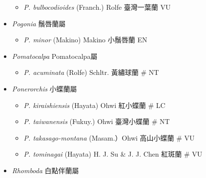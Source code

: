 \begin{itemize}
  \begin{itemize}
        \item[] \textit{P. bulbocodioides} (Franch.) Rolfe  臺灣一葉蘭   VU
  \end{itemize}
 \item[] \textit{Pogonia} 鬚唇蘭屬
                                
  \begin{itemize}
        \item[] \textit{P. minor} (Makino) Makino  小鬚唇蘭   EN
  \end{itemize}
 \item[] \textit{Pomatocalpa} Pomatocalpa屬
                                
  \begin{itemize}
        \item[] \textit{P. acuminata} (Rolfe) Schltr.  黃繡球蘭  \# NT
  \end{itemize}
 \item[] \textit{Ponerorchis} 小蝶蘭屬
                                
  \begin{itemize}
        \item[] \textit{P. kiraishiensis} (Hayata) Ohwi  紅小蝶蘭  \# LC
        \item[] \textit{P. taiwanensis} (Fukuy.) Ohwi  臺灣小蝶蘭  \# NT
        \item[] \textit{P. takasago-montana} (Masam.）Ohwi  高山小蝶蘭  \# VU
        \item[] \textit{P. tominagai} (Hayata) H. J. Su \& J. J. Chen  紅斑蘭  \# VU
  \end{itemize}
 \item[] \textit{Rhomboda} 白點伴蘭屬
                                

\end{itemize}
